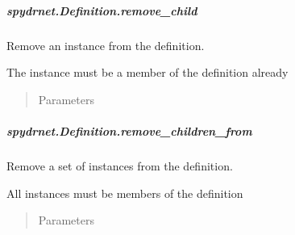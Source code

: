 \documentclass[letterpaper,10pt,english,openany,oneside]{sphinxmanual}
\begin{document}
\subparagraph{spydrnet.Definition.remove\_child}
\label{\detokenize{reference/classes/generated/spydrnet.Definition.remove_child:spydrnet-definition-remove-child}}\label{\detokenize{reference/classes/generated/spydrnet.Definition.remove_child::doc}}

\begin{fulllineitems}
\label{\detokenize{reference/classes/generated/spydrnet.Definition.remove_child:spydrnet.Definition.remove_child}}
Remove an instance from the definition.

The instance must be a member of the definition already
\begin{quote}\begin{description}
\item[{Parameters}] \leavevmode
{}

\end{description}\end{quote}

\end{fulllineitems}



\subparagraph{spydrnet.Definition.remove\_children\_from}
\label{\detokenize{reference/classes/generated/spydrnet.Definition.remove_children_from:spydrnet-definition-remove-children-from}}\label{\detokenize{reference/classes/generated/spydrnet.Definition.remove_children_from::doc}}

\begin{fulllineitems}
\label{\detokenize{reference/classes/generated/spydrnet.Definition.remove_children_from:spydrnet.Definition.remove_children_from}}
Remove a set of instances from the definition.

All instances must be members of the definition
\begin{quote}\begin{description}
\item[{Parameters}] \leavevmode
{}

\end{description}\end{quote}

\end{fulllineitems}
\end{document}
